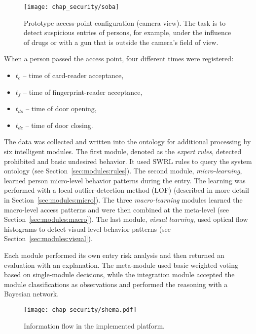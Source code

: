 \begin{figure}[!ht]
\centering
\texttt{[image: chap\_security/soba]}
\caption{Prototype access-point configuration (camera view). The task is to detect suspicious entries of persons, for example, under the influence of drugs or with a gun that is outside the camera's field of view.}
\label{fig:environment}
\end{figure}

When a person passed the access point, four different times were registered:
\begin{itemize}
    \item	$t_c$ -- time of card-reader acceptance,
    \item	$t_f$ -- time of fingerprint-reader acceptance,
    \item	$t_{do}$ -- time of door opening,
    \item	$t_{dc}$ -- time of door closing.
\end{itemize}
The data was collected and written into the ontology for additional processing by six intelligent modules. The first module, denoted as the \textit{expert rules}, detected prohibited and basic undesired behavior. It used SWRL rules to query the system ontology (see Section~\ref{sec:modules:rules}). The second module, \textit{micro-learning}, learned person micro-level behavior patterns during the entry. The learning was performed with a local outlier-detection me\-thod (LOF) (described in more detail in Section~\ref{sec:modules:micro}). The three  \textit{macro-learning} modules learned the macro-level access patterns and were then combined at the meta-level (see Section~\ref{sec:modules:macro}). The last module, \textit{visual learning}, used optical flow histograms to detect visual-level behavior patterns (see Section~\ref{sec:modules:visual}).

Each module performed its own entry risk analysis and then returned an evaluation with an explanation. The meta-module used basic weighted voting based on single-module decisions, while the integration module accepted the module classifications as observations and performed the reasoning with a Bayesian network. 

\begin{figure}[]
\centering
\texttt{[image: chap\_security/shema.pdf]}
\caption{Information flow in the implemented platform.}
\label{fig:implementation}
\end{figure}

